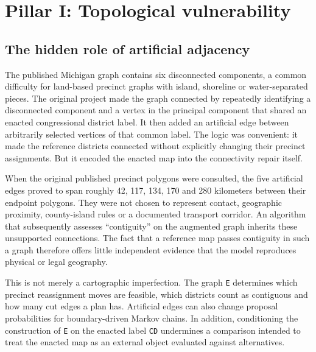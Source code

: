 \documentclass[
  10pt,
]{article}
\begin{document}
\hypertarget{pillar-i-topological-vulnerability}{%
\section{Pillar I: Topological
vulnerability}\label{pillar-i-topological-vulnerability}}

\hypertarget{the-hidden-role-of-artificial-adjacency}{%
\subsection{The hidden role of artificial
adjacency}\label{the-hidden-role-of-artificial-adjacency}}

The published Michigan graph contains six disconnected components, a
common difficulty for land-based precinct graphs with island, shoreline
or water-separated pieces. The original project made the graph connected
by repeatedly identifying a disconnected component and a vertex in the
principal component that shared an enacted congressional district label.
It then added an artificial edge between arbitrarily selected vertices
of that common label. The logic was convenient: it made the reference
districts connected without explicitly changing their precinct
assignments. But it encoded the enacted map into the connectivity repair
itself.

When the original published precinct polygons were consulted, the five
artificial edges proved to span roughly 42, 117, 134, 170 and 280
kilometers between their endpoint polygons. They were not chosen to
represent contact, geographic proximity, county-island rules or a
documented transport corridor. An algorithm that subsequently assesses
``contiguity'' on the augmented graph inherits these unsupported
connections. The fact that a reference map passes contiguity in such a
graph therefore offers little independent evidence that the model
reproduces physical or legal geography.

This is not merely a cartographic imperfection. The graph \texttt{E}
determines which precinct reassignment moves are feasible, which
districts count as contiguous and how many cut edges a plan has.
Artificial edges can also change proposal probabilities for
boundary-driven Markov chains. In addition, conditioning the
construction of \texttt{E} on the enacted label \texttt{CD} undermines a
comparison intended to treat the enacted map as an external object
evaluated against alternatives.
\end{document}
